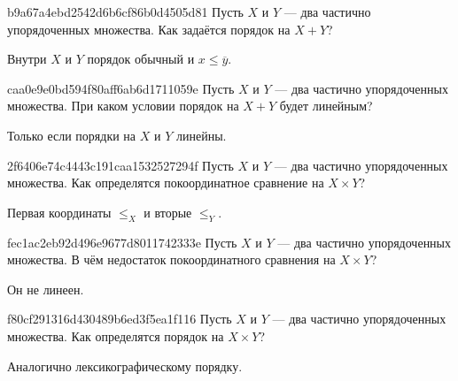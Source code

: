 \begin{note}{b9a67a4ebd2542d6b6cf86b0d4505d81}
    Пусть \({ X }\) и \({ Y }\) --- два частично упорядоченных множества.
    Как задаётся порядок на \({ X + Y }\)?

    \begin{cloze}{1}
        Внутри \({ X }\) и \({ Y }\) порядок обычный и \({ x \leqslant \overline{y} }\).
    \end{cloze}
\end{note}

\begin{note}{caa0e9e0bd594f80aff6ab6d1711059e}
    Пусть \({ X }\) и \({ Y }\) --- два частично упорядоченных множества.
    При каком условии порядок на \({ X + Y }\) будет линейным?

    \begin{cloze}{1}
        Только если порядки на \({ X }\) и \({ Y }\) линейны.
    \end{cloze}
\end{note}

\begin{note}{2f6406e74c4443c191caa1532527294f}
    Пусть \({ X }\) и \({ Y }\) --- два частично упорядоченных множества.
    Как определятся покоординатное сравнение на \({ X \times Y }\)?

    \begin{cloze}{1}
        Первая координаты \({ \leqslant_{X} }\) и вторые \({ \leqslant_{Y} }\).
    \end{cloze}
\end{note}

\begin{note}{fec1ac2eb92d496e9677d8011742333e}
    Пусть \({ X }\) и \({ Y }\) --- два частично упорядоченных множества.
    В чём недостаток покоординатного сравнения на \({ X \times Y }\)?

    \begin{cloze}{1}
        Он не линеен.
    \end{cloze}
\end{note}

\begin{note}{f80cf291316d430489b6ed3f5ea1f116}
    Пусть \({ X }\) и \({ Y }\) --- два частично упорядоченных множества.
    Как определятся порядок на \({ X \times Y }\)?

    \begin{cloze}{1}
        Аналогично лексикографическому порядку.
    \end{cloze}
\end{note}

